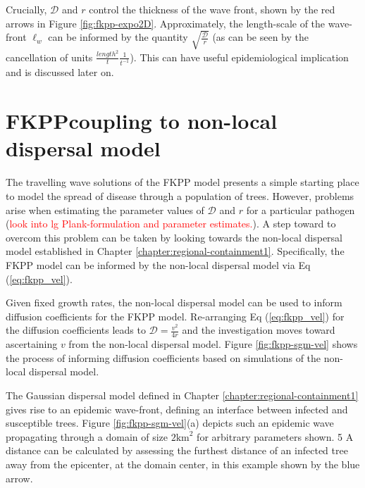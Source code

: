Crucially, $\mathcal{D}$ and $r$ control the thickness of the wave front, shown by the red arrows in Figure \ref{fig:fkpp-expo2D}. %
Approximately, the length-scale of the wave-front $\ell_{w}$ can be informed by the quantity $\sqrt{ \frac{\mathcal{D}}{r}}$ (as can be seen by the cancellation of units $\frac{length^2}{t} \frac{1}{t^{-1}}$). %
This can have useful epidemiological implication and is  discussed later on. 

\section{FKPP\textemdash coupling to non-local dispersal model}

The travelling wave solutions of the FKPP model presents a simple starting place to model the spread of disease through a population of trees. %
However, problems arise when estimating the parameter values of $\mathcal{D}$ and $r$ for a particular pathogen (\textcolor{red}{look into lg Plank-formulation and parameter estimates.}). %
A step toward to overcom this problem %
can be taken by looking towards the non-local dispersal model established in Chapter \ref{chapter:regional-containment1}. %
Specifically, the FKPP model can be informed by the non-local dispersal model via Eq (\ref{eq:fkpp_vel}).

Given fixed growth rates, the non-local dispersal model can be used to inform diffusion coefficients for the FKPP model. %
Re-arranging Eq (\ref{eq:fkpp_vel}) for the diffusion coefficients leads to $\mathcal{D} = \frac{v^2}{4r}$ and the %
investigation moves toward ascertaining $v$ from the non-local dispersal model. %
Figure \ref{fig:fkpp-sgm-vel} shows the process of informing diffusion coefficients based on simulations of the non-local dispersal model. 

The Gaussian dispersal model defined in Chapter \ref{chapter:regional-containment1} gives rise to an epidemic wave-front, defining an interface between infected and susceptible trees. %
Figure \ref{fig:fkpp-sgm-vel}(a) depicts such an epidemic wave propagating through a domain of size $2\mathrm{km}^2$ for arbitrary parameters shown. 5
A distance can be calculated by assessing the furthest distance of an infected tree away from the epicenter, at the domain center, in this example shown by the blue arrow. %

